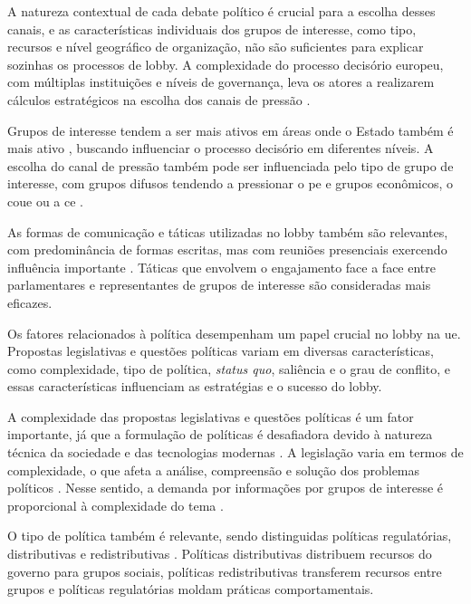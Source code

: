     A natureza contextual de cada debate político é crucial para a escolha desses canais, e as características individuais dos grupos de interesse, como tipo, recursos e nível geográfico de organização, não são suficientes para explicar sozinhas os processos de lobby. A complexidade do processo decisório europeu, com múltiplas instituições e níveis de governança, leva os atores a realizarem cálculos estratégicos na escolha dos canais de pressão \cite{kluver2015legislative}.

    Grupos de interesse tendem a ser mais ativos em áreas onde o Estado também é mais ativo \cite{mahoney2008brussels}, buscando influenciar o processo decisório em diferentes níveis. A escolha do canal de pressão também pode ser influenciada pelo tipo de grupo de interesse, com grupos difusos tendendo a pressionar o \acrshort{pe} e grupos econômicos, o \acrshort{coue} ou a \acrshort{ce} \cite{coen2019legislative}.

    As formas de comunicação e táticas utilizadas no lobby também são relevantes, com predominância de formas escritas, mas com reuniões presenciais exercendo influência importante \cite{Huwyler2022}. Táticas que envolvem o engajamento face a face entre parlamentares e representantes de grupos de interesse são consideradas mais eficazes.

Os fatores relacionados à política desempenham um papel crucial no lobby na \acrshort{ue}. Propostas legislativas e questões políticas variam em diversas características, como complexidade, tipo de política, \textit{status quo}, saliência e o grau de conflito, e essas características influenciam as estratégias e o sucesso do lobby.

    A complexidade das propostas legislativas e questões políticas é um fator importante, já que a formulação de políticas é desafiadora devido à natureza técnica da sociedade e das tecnologias modernas \cite{kluver2015legislative}. A legislação varia em termos de complexidade, o que afeta a análise, compreensão e solução dos problemas políticos \cite{kluver_informational_2012, WOLL}. Nesse sentido, a demanda por informações por grupos de interesse é proporcional à complexidade do tema \cite{kluver_informational_2012}.

    O tipo de política também é relevante, sendo distinguidas políticas regulatórias, distributivas e redistributivas \cite{lowi1964american}. Políticas distributivas distribuem recursos do governo para grupos sociais, políticas redistributivas transferem recursos entre grupos e políticas regulatórias moldam práticas comportamentais.


